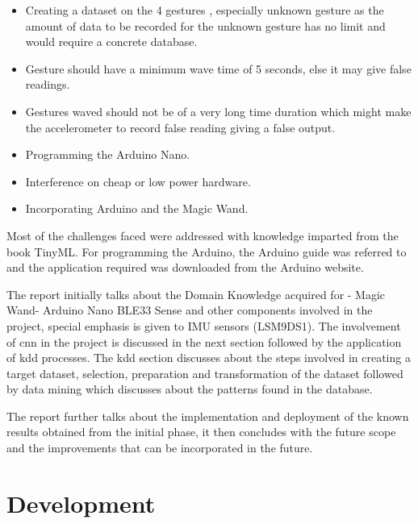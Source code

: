 \begin{itemize}
    \item Creating a dataset on the 4 gestures , especially unknown gesture as the amount of data to be recorded for the unknown gesture has no limit and would require a concrete database.
    
    \item Gesture should have a minimum wave time of 5 seconds, else it may give false readings.
    
    \item Gestures waved should not be of a very long time duration which might make the accelerometer to record false reading giving a false output.
    
    \item Programming the Arduino Nano.
    
    \item Interference on cheap or low power hardware.
    
    \item Incorporating Arduino and the Magic Wand.
    
    
\end{itemize}
\bigskip
Most of the challenges faced were addressed with knowledge imparted from the book TinyML. For programming the Arduino, the Arduino guide was referred to and the application required was downloaded from the Arduino website. 

The report initially talks about the Domain Knowledge acquired for - Magic Wand- Arduino Nano BLE33 Sense and other components involved in the project, special emphasis is given to IMU sensors (LSM9DS1). The involvement of \ac{cnn} in the project is discussed in the next section followed by the application of \ac{kdd} processes. The \ac{kdd} section discusses about the steps involved in creating a target dataset, selection, preparation and transformation of the dataset followed by data mining which discusses about the patterns found in the database. 

The report further talks about the implementation and deployment of the known results obtained from the initial phase, it then concludes with the future scope and the improvements that can be incorporated in the future.




\section{Development}

